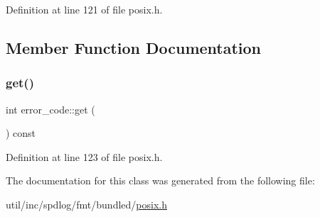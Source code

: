 Definition at line 121 of file posix.\+h.



\subsection{Member Function Documentation}
\mbox{\label{classerror__code_af42e923dd7f4e8451445341eade677c4}} 
\subsubsection{\texorpdfstring{get()}{get()}}
{\footnotesize\ttfamily int error\+\_\+code\+::get (\begin{DoxyParamCaption}{ }\end{DoxyParamCaption}) const\hspace{0.3cm}{\ttfamily [inline]}}



Definition at line 123 of file posix.\+h.



The documentation for this class was generated from the following file\+:\begin{DoxyCompactItemize}
\item 
util/inc/spdlog/fmt/bundled/\hyperlink{posix_8h}{posix.\+h}\end{DoxyCompactItemize}
